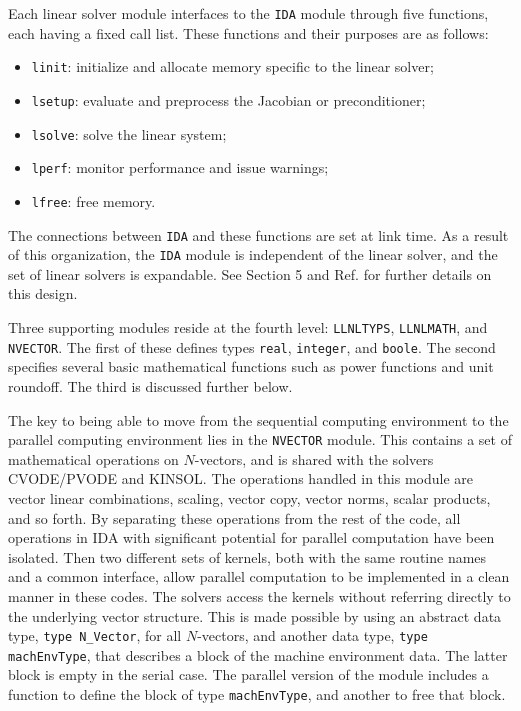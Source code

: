 \documentclass[11pt]{article}
\begin{document}
Each linear solver module interfaces to the {\tt IDA} module through
five functions, each having a fixed call list.  These functions and
their purposes are as follows:
\begin{itemize}
\item {\tt linit}: initialize and allocate memory specific to the
linear solver;
\item {\tt lsetup}: evaluate and preprocess the Jacobian or preconditioner;
\item {\tt lsolve}: solve the linear system;
\item {\tt lperf}: monitor performance and issue warnings;
\item {\tt lfree}: free memory.
\end{itemize}
The connections between {\tt IDA} and these functions are set at link time.
As a result of this organization, the {\tt IDA} module is independent
of the linear solver, and the set of linear solvers is expandable.
See Section 5 and Ref. \cite{CoHi96} for further details on this design.

Three supporting modules reside at the fourth level: {\tt LLNLTYPS},
{\tt LLNLMATH}, and {\tt NVECTOR}.  The first of these defines types
{\tt real}, {\tt integer}, and {\tt boole}.  The second specifies
several basic mathematical functions such as power functions and unit
roundoff.  The third is discussed further below.

The key to being able to move from the sequential computing
environment to the parallel computing environment lies in the 
{\tt NVECTOR} module.  This contains a set of mathematical operations
on $N$-vectors, and is shared with the solvers CVODE/PVODE and KINSOL.
The operations handled in this module are vector linear combinations,
scaling, vector copy, vector norms, scalar products, and so forth.  By
separating these operations from the rest of the code, all operations
in IDA with significant potential for parallel computation have been
isolated. Then two different sets of kernels, both with the same
routine names and a common interface, allow parallel computation to be
implemented in a clean manner in these codes.  The solvers access
the kernels without referring directly to the underlying vector
structure.  This is made possible by using an abstract data type, 
{\tt type N\_Vector}, for all $N$-vectors, and another data type, 
{\tt type machEnvType}, that describes a block of the machine
environment data.  The latter block is empty in the serial case.  The
parallel version of the module includes a function to define the block
of type {\tt machEnvType}, and another to free that block.
\end{document}
